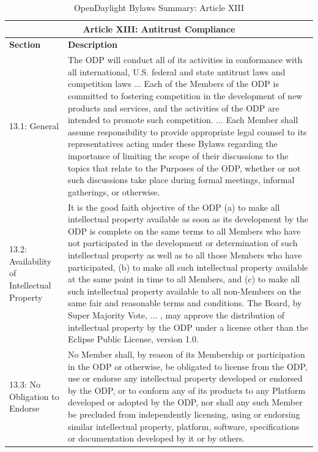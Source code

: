 \documentclass[a4paper, 12pt]{book}
\begin{document}
{\begin{table}[H]
  \begin{center}
    \begin{tabular}{ | p{3cm} | p{12cm} | }
    \toprule
    \multicolumn {2}{|c|}{\textbf{Article XIII: Antitrust Compliance}} \\
    \hline
    \textbf{Section} & \textbf{Description} \\
    \hline
    13.1: General & The ODP will conduct all of its activities in conformance with all international, U.S. federal and state antitrust laws and competition laws ... Each of the Members of the ODP is committed to fostering competition in the development of new products and services, and the activities of the ODP are intended to promote such competition. ... Each Member shall assume responsibility to provide appropriate legal counsel to its representatives acting under these Bylaws regarding the importance of limiting the scope of their discussions to the topics that relate to the Purposes of the ODP, whether or not such discussions take place during formal meetings, informal gatherings, or otherwise.\\
    \hline
    13.2: Availability of Intellectual Property & It is the good faith objective of the ODP (a) to make all intellectual property available as soon as its development by the ODP is complete on the same terms to all Members who have not participated in the development or determination of such intellectual property as well as to all those Members who have participated, (b) to make all such intellectual property available at the same point in time to all Members, and (c) to make all such intellectual property available to all non-Members on the same fair and reasonable terms and conditions.  The Board, by Super Majority Vote, ... , may approve the distribution of intellectual property by the ODP under a license other than the Eclipse Public License, version 1.0.\\
    \hline
    13.3: No Obligation to Endorse & No Member shall, by reason of its Membership or participation in the ODP or otherwise, be obligated to license from the ODP, use or endorse any intellectual property developed or endorsed by the ODP, or to conform any of its products to any Platform developed or adopted by the ODP, nor shall any such Member be precluded from independently licensing, using or endorsing similar intellectual property, platform, software, specifications or documentation developed by it or by others.\\
    \bottomrule
    \end{tabular}
    \caption{OpenDaylight Bylaws Summary: Article XIII}
    \label{tab:odlbylaws-art13}
  \end{center}
\end{table}

}
\end{document}
